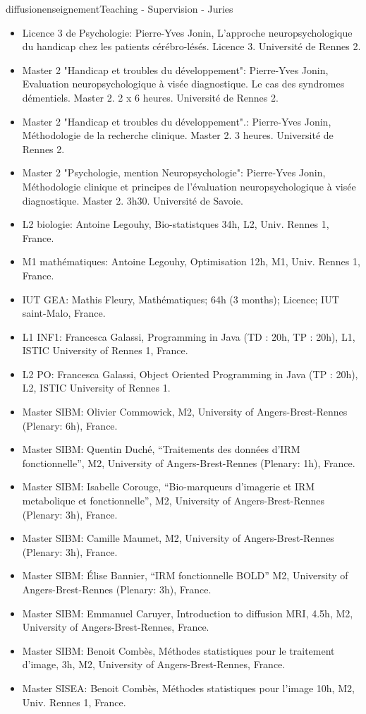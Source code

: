 \documentclass{ra2018}
\begin{document}
\begin{module}{diffusion}{enseignement}{Teaching - Supervision - Juries}
\begin{itemize}
    \item Licence 3 de Psychologie: Pierre-Yves Jonin, L'approche neuropsychologique du handicap chez les patients cérébro-lésés. Licence 3. Université de Rennes 2.
    \item Master 2 "Handicap et troubles du développement": Pierre-Yves Jonin, Evaluation neuropsychologique à visée diagnostique. Le cas des syndromes démentiels. Master 2. 2 x 6 heures. Université de Rennes 2.
    \item Master 2 "Handicap et troubles du développement".: Pierre-Yves Jonin, Méthodologie de la recherche clinique. Master 2. 3 heures. Université de Rennes 2.
    \item Master 2 "Psychologie, mention Neuropsychologie": Pierre-Yves Jonin, Méthodologie clinique et principes de l’évaluation neuropsychologique à visée diagnostique. Master 2. 3h30. Université de Savoie.
    \item L2 biologie: Antoine Legouhy, Bio-statistques 34h, L2, Univ. Rennes 1, France.
    \item M1 mathématiques: Antoine Legouhy, Optimisation 12h, M1, Univ. Rennes 1, France.
    \item IUT GEA: Mathis Fleury, Mathématiques; 64h (3 months); Licence; IUT saint-Malo, France.
    \item L1 INF1: Francesca Galassi, Programming in Java (TD : 20h, TP : 20h), L1, ISTIC University of Rennes 1, France.
    \item L2 PO: Francesca Galassi, Object Oriented Programming in Java (TP : 20h), L2, ISTIC University of Rennes 1.
    \item Master SIBM: Olivier Commowick, M2, University of Angers-Brest-Rennes (Plenary: 6h), France.
    \item Master SIBM: Quentin Duché, ``Traitements des données d'IRM fonctionnelle'', M2, University of Angers-Brest-Rennes (Plenary: 1h), France.
    \item Master SIBM: Isabelle Corouge, ``Bio-marqueurs d’imagerie et IRM metabolique et fonctionnelle'', M2, University of Angers-Brest-Rennes (Plenary: 3h), France.
    \item Master SIBM: Camille Maumet, M2, University of Angers-Brest-Rennes (Plenary: 3h), France.
    \item Master SIBM: Élise Bannier, ``IRM fonctionnelle BOLD'' M2, University of Angers-Brest-Rennes (Plenary: 3h), France.
    \item Master SIBM: Emmanuel Caruyer, Introduction to diffusion MRI, 4.5h, M2, University of Angers-Brest-Rennes, France.
     \item Master SIBM: Benoit Combès, Méthodes statistiques pour le traitement d'image, 3h, M2, University of Angers-Brest-Rennes, France.
    \item Master SISEA: Benoit Combès, Méthodes statistiques pour l'image 10h, M2, Univ. Rennes 1, France.
 \end{itemize}


\end{module}
\end{document}
